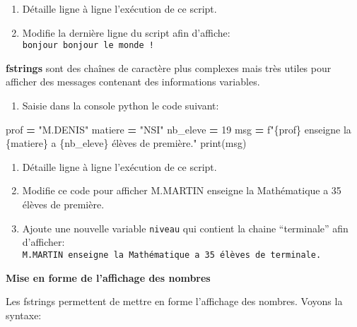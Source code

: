 \documentclass[
]{book}
\newenvironment{Shaded}{\begin{snugshade}}{\end{snugshade}}
\newcommand{\BuiltInTok}[1]{#1}
\newcommand{\DecValTok}[1]{\textcolor[rgb]{0.00,0.00,0.81}{#1}}
\newcommand{\NormalTok}[1]{#1}
\newcommand{\OperatorTok}[1]{\textcolor[rgb]{0.81,0.36,0.00}{\textbf{#1}}}
\newcommand{\SpecialCharTok}[1]{\textcolor[rgb]{0.00,0.00,0.00}{#1}}
\newcommand{\SpecialStringTok}[1]{\textcolor[rgb]{0.31,0.60,0.02}{#1}}
\newcommand{\StringTok}[1]{\textcolor[rgb]{0.31,0.60,0.02}{#1}}
\providecommand{\tightlist}{%
  \setlength{\itemsep}{0pt}\setlength{\parskip}{0pt}}
\def\tightlist{}
\begin{document}
\begin{enumerate}
\def\labelenumi{\arabic{enumi}.}
\setcounter{enumi}{1}
\tightlist
\item
  Détaille ligne à ligne l'exécution de ce script.
\item
  Modifie la dernière ligne du script afin d'affiche: \texttt{bonjour\ bonjour\ le\ monde\ !}
\end{enumerate}

\textbf{fstrings} sont des chaînes de caractère plus complexes mais très utiles pour afficher des messages contenant des informations variables.

\begin{enumerate}
\def\labelenumi{\arabic{enumi}.}
\tightlist
\item
  Saisie dans la console python le code suivant:
\end{enumerate}

\begin{Shaded}
\begin{Highlighting}[]
\NormalTok{prof }\OperatorTok{=} \StringTok{"M.DENIS"}
\NormalTok{matiere }\OperatorTok{=} \StringTok{"NSI"}
\NormalTok{nb\_eleve }\OperatorTok{=} \DecValTok{19}
\NormalTok{msg }\OperatorTok{=} \SpecialStringTok{f"}\SpecialCharTok{\{}\NormalTok{prof}\SpecialCharTok{\}}\SpecialStringTok{ enseigne la }\SpecialCharTok{\{}\NormalTok{matiere}\SpecialCharTok{\}}\SpecialStringTok{ a }\SpecialCharTok{\{}\NormalTok{nb\_eleve}\SpecialCharTok{\}}\SpecialStringTok{ élèves de première."}
\BuiltInTok{print}\NormalTok{(msg)}
\end{Highlighting}
\end{Shaded}

\begin{enumerate}
\def\labelenumi{\arabic{enumi}.}
\setcounter{enumi}{1}
\tightlist
\item
  Détaille ligne à ligne l'exécution de ce script.
\item
  Modifie ce code pour afficher M.MARTIN enseigne la Mathématique a 35 élèves de première.
\item
  Ajoute une nouvelle variable \texttt{niveau} qui contient la chaine ``terminale'' afin d'afficher: \texttt{M.MARTIN\ enseigne\ la\ Mathématique\ a\ 35\ élèves\ de\ terminale.}
\end{enumerate}

\textbf{Mise en forme de l'affichage des nombres}

Les fstrings permettent de mettre en forme l'affichage des nombres. Voyons la syntaxe:
\end{document}

